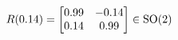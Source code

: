 \documentclass[preview]{standalone}
\begin{document}
\begin{align*}
\special{dvisvgm:raw <g id='unique000'>}R(0.14) = \begin{bmatrix} 0.99 & -0.14 \\ 0.14 & 0.99 \end{bmatrix} \in \text{SO}(2)\special{dvisvgm:raw </g>}
\end{align*}
\end{document}
